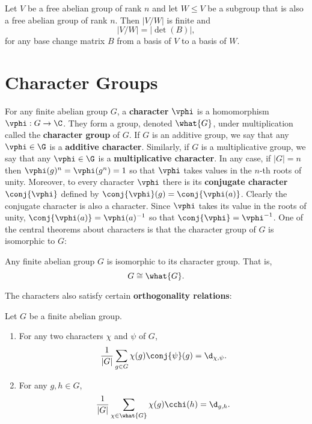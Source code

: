     \begin{proposition}\label{prop:base_change_quotient_determinant}
      Let $V$ be a free abelian group of rank $n$ and let $W \le V$ be a subgroup that is also a free abelian group of rank $n$. Then $|V/W|$ is finite and
      \[
        |V/W| = |\det(B)|,
      \]
      for any base change matrix $B$ from a basis of $V$ to a basis of $W$.
    \end{proposition}
  \section{Character Groups}\label{append:Character_Groups}
    For any finite abelian group $G$, a \textbf{character} $\vphi$ is a homomorphism $\vphi:G \to \C$. They form a group, denoted $\what{G}$, under multiplication called the \textbf{character group} of $G$. If $G$ is an additive group, we say that any $\vphi \in \G$ is a \textbf{additive character}. Similarly, if $G$ is a multiplicative group, we say that any $\vphi \in \G$ is a \textbf{multiplicative character}. In any case, if $|G| = n$ then $\vphi(g)^{n} = \vphi(g^{n}) = 1$ so that $\vphi$ takes values in the $n$-th roots of unity. Moreover, to every character $\vphi$ there is its \textbf{conjugate character} $\conj{\vphi}$ defined by $\conj{\vphi}(g) = \conj{\vphi(a)}$. Clearly the conjugate character is also a character. Since $\vphi$ takes its value in the roots of unity, $\conj{\vphi(a)} = \vphi(a)^{-1}$ so that $\conj{\vphi} = \vphi^{-1}$. One of the central theorems about characters is that the character group of $G$ is isomorphic to $G$:

    \begin{proposition}\label{prop:character_group_isomorphim}
      Any finite abelian group $G$ is isomorphic to its character group. That is,
      \[
        G \cong \what{G}.
      \]
    \end{proposition}

    The characters also satisfy certain \textbf{orthogonality relations}:

    \begin{proposition}
      Let $G$ be a finite abelian group.
      \begin{enumerate}[label=(\roman*)]
        \item For any two characters $\chi$ and $\psi$ of $G$,
        \[
          \frac{1}{|G|}\sum_{g \in G}\chi(g)\conj{\psi}(g) = \d_{\chi,\psi}.
        \]
        \item For any $g,h \in G$,
        \[
          \frac{1}{|G|}\sum_{\chi \in \what{G}}\chi(g)\cchi(h) = \d_{g,h}.
        \]
      \end{enumerate}
    \end{proposition}
